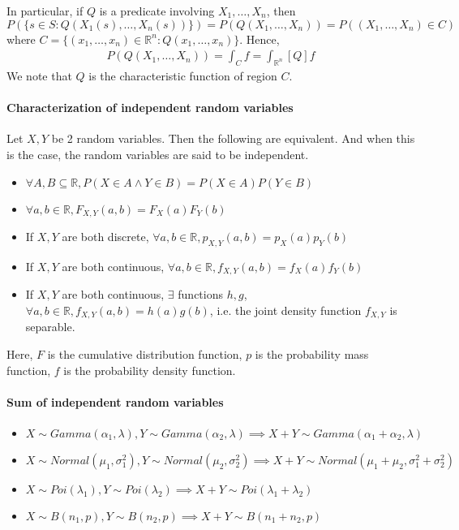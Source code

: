 \documentclass{article}
\begin{document}
In particular, if $Q$ is a predicate involving $X_1,\dots,X_n$, then $P(\{s\in S : Q(X_1(s),\dots,X_n(s))\}) = P(Q(X_1,\dots,X_n)) = P((X_1,\dots,X_n) \in C)$ where $C = \{(x_1,\dots,x_n)\in \mathbb{R}^n : Q(x_1,\dots,x_n)\}$. Hence,
\begin{align*}
	P(Q(X_1,\dots,X_n)) = \int_C f = \int_{\mathbb{R}^n}[Q]f
\end{align*}
We note that $Q$ is the characteristic function of region $C$.

\paragraph{Characterization of independent random variables} Let $X, Y$ be 2 random variables. Then the following are equivalent. And when this is the case, the random variables are said to be independent.
\begin{itemize}
	\item $\forall A, B\subseteq \mathbb{R}, P(X\in A\land Y\in B) = P(X\in A)P(Y\in B)$
	\item $\forall a, b\in \mathbb{R}, F_{X, Y}(a, b) = F_X(a)F_Y(b)$
	\item If $X, Y$ are both discrete, $\forall a, b\in \mathbb{R}, p_{X,Y}(a, b) = p_X(a)p_Y(b)$
	\item If $X, Y$ are both continuous, $\forall a, b\in \mathbb{R}, f_{X,Y}(a, b) = f_X(a)f_Y(b)$
	\item If $X, Y$ are both continuous, $\exists$ functions $h,g$, $\forall a,b\in \mathbb{R}, f_{X, Y}(a, b) = h(a)g(b)$, i.e. the joint density function $f_{X,Y}$ is separable. 
\end{itemize}
Here, $F$ is the cumulative distribution function, $p$ is the probability mass function, $f$ is the probability density function.

\paragraph{Sum of independent random variables}
\begin{itemize}
	\item $X\sim Gamma(\alpha_1, \lambda), Y\sim Gamma(\alpha_2, \lambda)\implies X+Y\sim Gamma(\alpha_1 + \alpha_2, \lambda)$
	\item $X\sim Normal(\mu_1, \sigma_1^2), Y\sim Normal(\mu_2, \sigma_2^2)\implies X+Y\sim Normal(\mu_1 + \mu_2, \sigma_1^2 + \sigma_2^2)$
	\item $X\sim Poi(\lambda_1), Y\sim Poi(\lambda_2)\implies X+Y\sim Poi(\lambda_1+\lambda_2)$
	\item $X\sim B(n_1,p), Y\sim B(n_2,p)\implies X+Y\sim B(n_1+n_2,p)$
\end{itemize}
\end{document}
